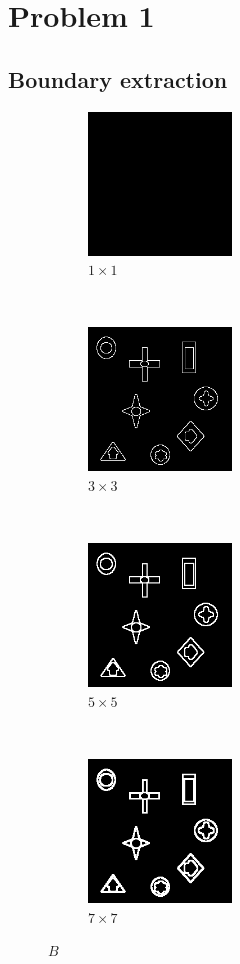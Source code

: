 \documentclass[12pt]{article}
\begin{document}
\section*{Problem 1}
\subsection*{Boundary extraction}
\begin{figure}[H]
    \centering
    \begin{subfigure}[t]{0.24\textwidth}
        \centering
        \includegraphics[height=1.5in]{images/B_m1}
        \caption{$1 \times 1$}
    \end{subfigure}%
    ~ 
    \begin{subfigure}[t]{0.24\textwidth}
        \centering
        \includegraphics[height=1.5in]{images/B_m3}
        \caption{$3 \times 3$}
    \end{subfigure}%
    ~
    \begin{subfigure}[t]{0.24\textwidth}
        \centering
        \includegraphics[height=1.5in]{images/B_m5}
        \caption{$5 \times 5$}
    \end{subfigure}%
    ~
    \begin{subfigure}[t]{0.24\textwidth}
        \centering
        \includegraphics[height=1.5in]{images/B_m7}
        \caption{$7 \times 7$}
    \end{subfigure}
    \caption{$B$}
\end{figure}
\end{document}
